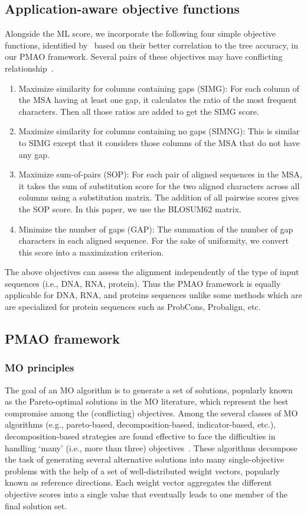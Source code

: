 \documentclass[a4paper,fleqn, review]{cas-dc}
\begin{document}
\subsection{Application-aware objective functions}
Alongside the ML score, we incorporate the following four simple objective functions, identified by~\cite{nayeem2020multiobjective} based on their better correlation to the tree accuracy, in our PMAO framework. Several pairs of these objectives may have conflicting relationship~\cite{nayeem2020multiobjective}.
\begin{enumerate}
	\item Maximize similarity for columns containing gaps (SIMG): For each column of the MSA having at least one gap, it calculates the ratio of the most frequent characters. Then all those ratios are added to get the SIMG score.
	\item Maximize similarity for columns containing no gaps (SIMNG): This is similar to SIMG except that it considers those columns of the MSA that do not have any gap.
	\item Maximize sum-of-pairs (SOP): For each pair of aligned sequences in the MSA, it takes the sum of substitution score for the two aligned characters across all columns using a substitution matrix. The addition of all pairwise scores gives the SOP score. In this paper, we use the BLOSUM62 matrix.
	\item Minimize the number of gaps (GAP): The summation of the number of gap characters in each aligned sequence. For the sake of uniformity, we convert this score into a maximization criterion.
\end{enumerate}

The above objectives can assess the alignment independently of the type of input sequences (i.e., DNA, RNA, protein). Thus the PMAO framework is equally applicable for DNA, RNA, and proteins sequences unlike some methods which are are specialized for protein sequences such as ProbCons, Probalign, etc.

\subsection{PMAO framework}
\subsubsection{MO principles}
The goal of an MO algorithm is to generate a set of solutions, popularly known as the Pareto-optimal solutions in the MO literature, which represent the best compromise among the (conflicting) objectives.
Among the several classes of MO algorithms (e.g., pareto-based, decomposition-based, indicator-based, etc.), decomposition-based strategies are found effective to face the difficulties in handling `many' (i.e., more than three) objectives~\cite{li2015many}. These algorithms decompose the task of generating several alternative solutions into many single-objective problems with the help of a set of well-distributed weight vectors, popularly known as reference directions. Each weight vector aggregates the different objective scores into a single value that eventually leads to one member of the final solution set.
\end{document}
